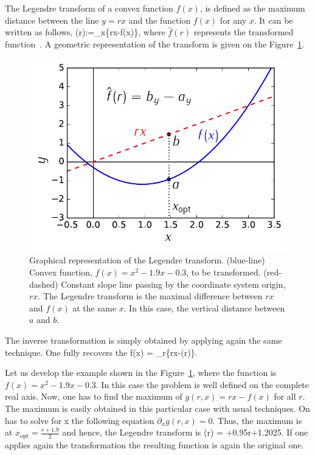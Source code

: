 The Legendre transform of a convex function $f(x)$, is defined as the maximum distance between the line $y=rx$ and the function $f(x)$ for any $x$.
It can be written as follows,
\be
  (r):=\max_{x}\{rx-f(x)\},
\ee
where $\hat{f}(r)$ represents the transformed function~\cite{Rockafellar1996}.
A geometric representation of the transform is given on the Figure~\ref{fig:lt-geometric-legendre}.
\begin{figure}[htp]
  \centering
  \includegraphics[scale=.65]{img/AP_legendre.pdf}
  \caption[Graphical representation of the Legendre transform.]{
  Graphical representation of the Legendre transform. (blue-line) Convex function, $f(x)=x^2-1.9x-0.3$, to be transformed. (red-dashed) Constant slope line passing by the coordinate system origin, $rx$. The Legendre transform is the maximal difference between $rx$ and $f(x)$ at the same $x$. In this case, the vertical distance between $a$ and $b$.}
  \label{fig:lt-geometric-legendre}
\end{figure}

The inverse transformation is simply obtained by applying again the same technique.
One fully recovers the
\be
  f(x) = \max_{r}\{rx-(r)\}.
\ee

Let us develop the example shown in the Figure~\ref{fig:lt-geometric-legendre}, where the function is $f(x)=x^2-1.9x-0.3$.
In this case the problem is well defined on the complete real axis.
Now, one has to find the maximum of $g(r,x)=rx-f(x)$ for all $r$.
The maximum is easily obtained in this particular case with usual techniques.
On has to solve for x the following equation $\partial_x g(r,x) = 0$. Thus, the maximum is at $x_{\text{opt}} = \frac{r+1.9}{2}$ and hence, the Legendre transform is
\be
  (r) = +0.95r+1.2025.
\ee
If one applies again the transformation the resulting function is again the original one.

